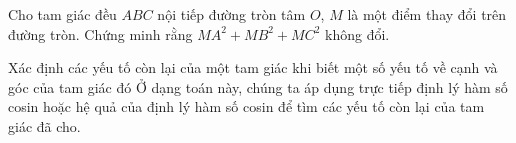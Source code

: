 \begin{bt}%
	Cho tam giác đều $ABC$ nội tiếp đường tròn tâm $O$, $M$ là một điểm thay đổi trên đường tròn. Chứng minh rằng $MA^2+MB^2+MC^2$ không đổi.
\end{bt}

\begin{dang}{Xác định các yếu tố còn lại của một tam giác khi biết một số yếu tố về cạnh và góc của tam giác đó}
Ở dạng toán này, chúng ta áp dụng trực tiếp định lý hàm số cosin hoặc hệ quả của định lý hàm số cosin để tìm các yếu tố còn lại của tam giác đã cho.
\end{dang}


